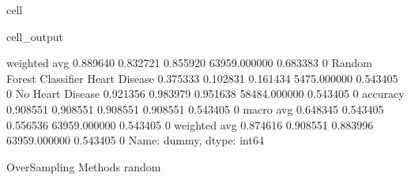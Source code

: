 \documentclass[letterpaper,10pt,english]{jupyterBook}
\begin{document}
\begin{sphinxuseclass}{cell}
\begin{sphinxVerbatimOutput}
\begin{sphinxuseclass}{cell_output}
\begin{sphinxVerbatim}[commandchars=\\\{\}]
                           weighted avg      0.889640   0.832721  0.855920  63959.000000  0.683383    0
Random Forest Classifier   Heart Disease     0.375333   0.102831  0.161434  5475.000000   0.543405    0
                           No Heart Disease  0.921356   0.983979  0.951638  58484.000000  0.543405    0
                           accuracy          0.908551   0.908551  0.908551  0.908551      0.543405    0
                           macro avg         0.648345   0.543405  0.556536  63959.000000  0.543405    0
                           weighted avg      0.874616   0.908551  0.883996  63959.000000  0.543405    0
Name: dummy, dtype: int64

OverSampling Methods
\PYGZhy{}\PYGZhy{}\PYGZhy{}\PYGZhy{}\PYGZhy{}\PYGZhy{}\PYGZhy{}\PYGZhy{}\PYGZhy{}\PYGZhy{}\PYGZhy{}\PYGZhy{}\PYGZhy{}\PYGZhy{}\PYGZhy{}\PYGZhy{}\PYGZhy{}\PYGZhy{}\PYGZhy{}
random
\PYGZhy{}\PYGZhy{}\PYGZhy{}\PYGZhy{}\PYGZhy{}\PYGZhy{}\PYGZhy{}\PYGZhy{}\PYGZhy{}\PYGZhy{}\PYGZhy{}\PYGZhy{}\PYGZhy{}\PYGZhy{}\PYGZhy{}\PYGZhy{}\PYGZhy{}\PYGZhy{}\PYGZhy{}
\end{sphinxVerbatim}

\noindent{}


\end{sphinxuseclass}
\end{sphinxVerbatimOutput}
\end{sphinxuseclass}
\end{document}
